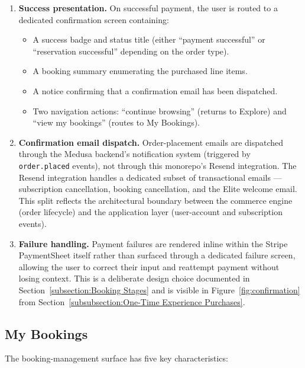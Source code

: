 \begin{enumerate}
  \item \textbf{Success presentation.} On successful payment, the user is routed to a dedicated confirmation screen containing:
    \begin{itemize}
      \item A success badge and status title (either ``payment successful'' or ``reservation successful'' depending on the order type).
      \item A booking summary enumerating the purchased line items.
      \item A notice confirming that a confirmation email has been dispatched.
      \item Two navigation actions: ``continue browsing'' (returns to Explore) and ``view my bookings'' (routes to My Bookings).
    \end{itemize}

  \item \textbf{Confirmation email dispatch.} Order-placement emails are dispatched through the Medusa backend's notification system (triggered by \texttt{order.placed} events), not through this monorepo's Resend integration. The Resend integration handles a dedicated subset of transactional emails --- subscription cancellation, booking cancellation, and the Elite welcome email. This split reflects the architectural boundary between the commerce engine (order lifecycle) and the application layer (user-account and subscription events).

  \item \textbf{Failure handling.} Payment failures are rendered inline within the Stripe PaymentSheet itself rather than surfaced through a dedicated failure screen, allowing the user to correct their input and reattempt payment without losing context. This is a deliberate design choice documented in Section~\ref{subsection:Booking Stages} and is visible in Figure~\ref{fig:confirmation} from Section~\ref{subsubsection:One-Time Experience Purchases}.
\end{enumerate}

\subsection{My Bookings}
The booking-management surface has five key characteristics:


